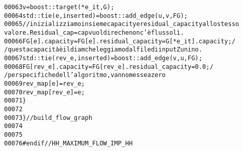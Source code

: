 \begin{footnotesize}
\begin{alltt}
00063                 v = boost::target(*e\_it, G);
00064                 std::tie(e, inserted) = boost::add\_edge(u, v, FG);
00065                 \textcolor{comment}{//inizializziamo insieme capacity e residual\_capacity allo stesso
       valore. Residual\_cap = cap vuol dire che non c'è flusso lì.}
00066                 FG[e].capacity = FG[e].residual\_capacity = G[*e\_it].capacity;           \textcolor{comment}{/
      /questa capacità è il diam che leggiamo dal file di input Zunino.}
00067                 std::tie(rev\_e, inserted) = boost::add\_edge(v, u, FG);
00068                 FG[rev\_e].capacity = FG[rev\_e].residual\_capacity = 0.0;         \textcolor{comment}{/
      /per specifiche dell'algoritmo, vanno messe a zero}
00069                 rev\_map[e] = rev\_e;
00070                 rev\_map[rev\_e] = e;     
00071         \}
00072 
00073 \}       \textcolor{comment}{//build\_flow\_graph}
00074 
00075 
00076 \textcolor{preprocessor}{#endif //HH\_MAXIMUM\_FLOW\_IMP\_HH}
\end{alltt}\end{footnotesize}
